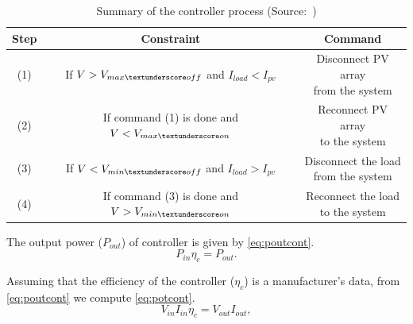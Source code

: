 \documentclass[review]{elsarticle}
\begin{document}
\begin{table}[!t]
\renewcommand{\arraystretch}{1.3}
\caption{Summary of the controller process (Source:~\cite{Hansen})}
\label{table:controller}
\centering
\begin{tabular}{c | c | c }
\hline
\hline
Step  & Constraint & Command\\
\hline
\hline
(1) & \makecell{If $V > V_{max \textunderscore off}$ \\and $I_{load} < I_{pv}$} & \makecell{Disconnect PV array \\from the system}\\
\hline
(2) & \makecell{If command (1) is \\done and $V < V_{max \textunderscore on}$} & \makecell{Reconnect PV array \\to the system}\\
\hline
(3) & \makecell{If $V < V_{min \textunderscore off}$ and \\ $I_{load} > I_{pv}$} & \makecell{Disconnect the load \\from the system}\\
\hline
(4) & \makecell{If command (3) is \\ done and $V > V_{min \textunderscore on}$} & \makecell{Reconnect the load \\to the system}\\
\hline
\hline
\end{tabular}
\end{table}

%
The output power ($ P_{out} $) of controller is given by \eqref{eq:poutcont}.
\begin{equation}
\label{eq:poutcont}
P_{in} \eta_{c} = P_{out}.
\end{equation}

Assuming that the efficiency of the controller ($ \eta_{c} $) is a manufacturer's data, from \eqref{eq:poutcont} we compute \eqref{eq:potcont}.
\begin{equation}
\label{eq:potcont}
V_{in} I_{in} \eta_{c} = V_{out} I_{out},
\end{equation}
\end{document}
